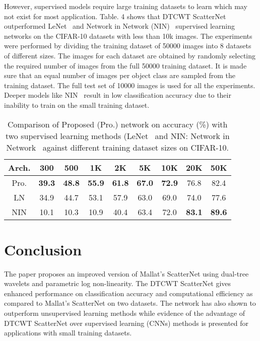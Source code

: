 \documentclass{article}
\begin{document}
However, supervised models require large training datasets to learn which may not exist for most application. Table. 4 shows that DTCWT ScatterNet outperformed LeNet~\cite{lee} and Network in Network (NIN)~\cite{NIN} supervised learning networks on the CIFAR-10 datasets with less than 10k images. The experiments were performed by dividing the training dataset of 50000 images into 8 datasets of different sizes. The images for each dataset are obtained by randomly selecting the required number of images from the full 50000 training dataset. It is made sure that an equal number of images per object class are sampled from the training dataset. The full test set of 10000 images is used for all the experiments. Deeper models like NIN~\cite{NIN} result in low classification accuracy due to their inability to train on the small training dataset.

\vspace{-5mm}
\begin{table}[!h]
\centering
\caption{\small{Comparison of Proposed (Pro.) network on accuracy (\%) with two supervised learning methods (LeNet~\cite{lee} and NIN: Network in Network~\cite{NIN} against different training dataset sizes on CIFAR-10.}}
\label{MNIST}

\begin{tabular}{c|cccccccc}
\hline
\small{Arch.} & \small{300} & \small{500} & \small{1K} & \small{2K} & \small{5K} & \small{10K} & \small{20K} & \small{50K}\\
 \hline
\small{Pro.} & \small{\textbf{39.3}} & \small{\textbf{48.8}} & \small{\textbf{55.9}} & \textbf{\small{61.8}} & \small{\textbf{67.0}} & \small{\textbf{72.9}} & \small{{76.8}} & \small{82.4}\\
\small{LN} & \small{{34.9}} & \small{44.7} & \small{53.1} & \small{57.9} & \small{{63.0}} & \small{69.0} & \small{74.0} & \small{77.6}\\
\small{NIN} & \small{{10.1}} & \small{10.3} & \small{10.9} & \small{40.4} & \small{{63.4}} & \small{72.0} & \textbf{\small{83.1}} & \textbf{\small{89.6}}\\
\end{tabular}
\end{table}
\vspace{-8mm}

\section{Conclusion}
The paper proposes an improved version of Mallat's ScatterNet using   dual-tree wavelets and parametric log non-linearity. The DTCWT ScatterNet gives enhanced performance on classification accuracy and computational efficiency as compared to Mallat's ScatterNet on two datasets. The network has also shown to outperform unsupervised learning methods while evidence of the advantage of DTCWT ScatterNet over supervised learning (CNNs) methods is presented for applications with small training datasets.  


\end{document}

